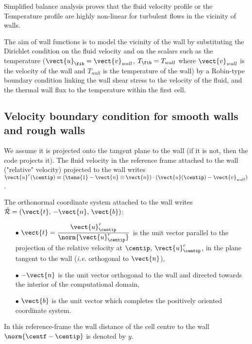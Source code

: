 Simplified balance analysis proves that the fluid velocity profile or the Temperature profile are
highly non-linear  for turbulent flows in the vicinity of walls.

The aim of wall functions is to model the vicinity of the wall by substituting the Dirichlet condition on the fluid velocity and on the scalars such as the temperature ($\vect{u}_\fib = \vect{v}_{wall}$, $T_\fib = T_{wall}$ where $\vect{v}_{wall}$ is the velocity of the wall and $T_{wall}$ is the temperature of the wall) by a Robin-type boundary condition linking the wall shear stress to the velocity of the fluid, and the
thermal wall flux to the temperature within the first cell.

\subsection{Velocity boundary condition for smooth walls and rough walls}
We assume it is projected onto the tangent plane to the wall (if it is not, then the code projects it).
The fluid velocity in the reference frame attached to the wall ("relative" velocity) projected to the wall writes
$\vect{u}^r (\centip) \equiv \left(\tens{1} - \vect{n} \otimes \vect{n} \right)\cdot \left( \vect{u}(\centip) - \vect{v}_{wall} \right)$.

The orthonormal coordinate system attached to the wall writes
$\hat {\mathcal R}=(\vect{t}, \, -\vect{n}, \, \vect{b})$:
%
\begin{itemize}
\item [$\bullet$] $\vect{t} = \displaystyle\frac{ \vect{u}^r_{\centip} }{ \norm{ \vect{u}^r_{\centip} }}$ is the unit vector parallel to the projection of the relative velocity at $\centip$, $\vect{u}^r_{\centip}$, in the plane tangent to the wall
 (\emph{i.e.} orthogonal to $\vect{n}$),
\item [$\bullet$] $-\vect{n}$ is the unit vector orthogonal to the wall and directed towards the interior of the computational domain,
\item[$\bullet$] $\vect{b}$ is the unit vector which completes the positively oriented coordinate system.
\end{itemize}
In this reference-frame the wall distance of the cell centre to the wall $\norm{\centf - \centip}$ is denoted by $y$.

